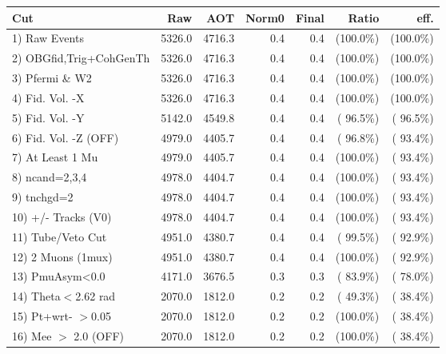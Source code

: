  \begin{table}[h!]\centering
 \begin{tabular}{||l||r|r|r|r|r|r||}
 \hline
 \hline
 Cut & Raw & AOT & Norm0 & Final & Ratio & eff.       \\
 \hline
  1) Raw Events           &       5326.0 &       4716.3 &          0.4 &          0.4 & (100.0\%) & (100.0\%) \\
  2) OBGfid,Trig+CohGenTh &       5326.0 &       4716.3 &          0.4 &          0.4 & (100.0\%) & (100.0\%) \\
  3) Pfermi \& W2         &       5326.0 &       4716.3 &          0.4 &          0.4 & (100.0\%) & (100.0\%) \\
  4) Fid. Vol. -X         &       5326.0 &       4716.3 &          0.4 &          0.4 & (100.0\%) & (100.0\%) \\
  5) Fid. Vol. -Y         &       5142.0 &       4549.8 &          0.4 &          0.4 & ( 96.5\%) & ( 96.5\%) \\
  6) Fid. Vol. -Z (OFF)   &       4979.0 &       4405.7 &          0.4 &          0.4 & ( 96.8\%) & ( 93.4\%) \\
  7) At Least 1 Mu        &       4979.0 &       4405.7 &          0.4 &          0.4 & (100.0\%) & ( 93.4\%) \\
  8) ncand=2,3,4          &       4978.0 &       4404.7 &          0.4 &          0.4 & (100.0\%) & ( 93.4\%) \\
  9) tnchgd=2             &       4978.0 &       4404.7 &          0.4 &          0.4 & (100.0\%) & ( 93.4\%) \\
 10) +/- Tracks (V0)      &       4978.0 &       4404.7 &          0.4 &          0.4 & (100.0\%) & ( 93.4\%) \\
 11) Tube/Veto Cut        &       4951.0 &       4380.7 &          0.4 &          0.4 & ( 99.5\%) & ( 92.9\%) \\
 12) 2 Muons (1mux)       &       4951.0 &       4380.7 &          0.4 &          0.4 & (100.0\%) & ( 92.9\%) \\
 13) PmuAsym<0.0          &       4171.0 &       3676.5 &          0.3 &          0.3 & ( 83.9\%) & ( 78.0\%) \\
 14) Theta$<$2.62 rad     &       2070.0 &       1812.0 &          0.2 &          0.2 & ( 49.3\%) & ( 38.4\%) \\
 15) Pt+wrt- $>$0.05      &       2070.0 &       1812.0 &          0.2 &          0.2 & (100.0\%) & ( 38.4\%) \\
 16) Mee $>$ 2.0  (OFF)   &       2070.0 &       1812.0 &          0.2 &          0.2 & (100.0\%) & ( 38.4\%) \\

\end{tabular}
\end{table}
